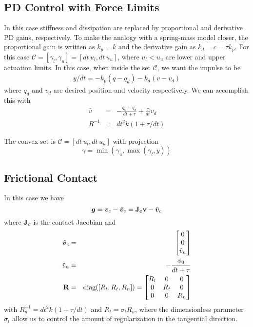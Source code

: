 \subsection{PD Control with Force Limits}
In this case stiffness and dissipation are replaced by proportional and
derivative PD gains, respectively. To make the analogy with a spring-mass model
closer, the proportional gain is written as $k_p = k$ and the derivative gain as
$k_d = c = \tau k_p$. For this case $\mathcal{C} = [\gamma_l, \gamma_u] =
[dt\,u_l, dt\,u_u]$, where $u_l < u_u$ are lower and upper actuation limits.  In
this case, when inside the set $\mathcal{C}$, we want the impulse to be
\begin{eqnarray}
	y/dt = -k_p(q-q_d)-k_d(v-v_d)
\end{eqnarray}
where $q_d$ and $v_d$ are desired position and velocity respectively. We can
accomplish this with
\begin{eqnarray}
	\hat{v} &=& -\frac{q_0-q_d}{dt+\tau}+\frac{\tau}{dt}v_d\nonumber\\
	R^{-1}  &=& dt^2k(1+\tau/dt)
\end{eqnarray}

The convex set is $\mathcal{C} = [dt\,u_l, dt\,u_u]$ with projection
\begin{equation}
	\gamma = \min(\gamma_u, \max(\gamma_l, y))
\end{equation}


\subsection{Frictional Contact}
In this case we have
\begin{equation}
	{\bm{g}} = {\bm{v}}_c - \hat{{\bm{v}}}_c = {\mathbf{J_c}}{\mathbf{v}} - \hat{{\bm{v}}}_c
\end{equation}
where ${\mathbf{J}}_c$ is the contact Jacobian and 
\begin{eqnarray}
	\hat{{\bm{v}}}_c &=&
	\begin{bmatrix}
		0\\
		0\\
		\hat{v}_n \end{bmatrix}\nonumber\\
	\hat{v}_n &=& -\frac{\phi_0}{dt+\tau}\nonumber\\
	{\mathbf{R}} &=& \text{diag}([R_t, R_t, R_n]) = 
	\begin{bmatrix}
		R_t &   0 & 0\\
		  0 & R_t & 0\\
		  0 &   0 & R_n
	\end{bmatrix}
\end{eqnarray}
with $R_n^{-1} = dt^2k(1+\tau/dt)$ and $R_t=\sigma_t R_n$, where the
dimensionless parameter $\sigma_t$ allow us to control the amount of
regularization in the tangential direction.

